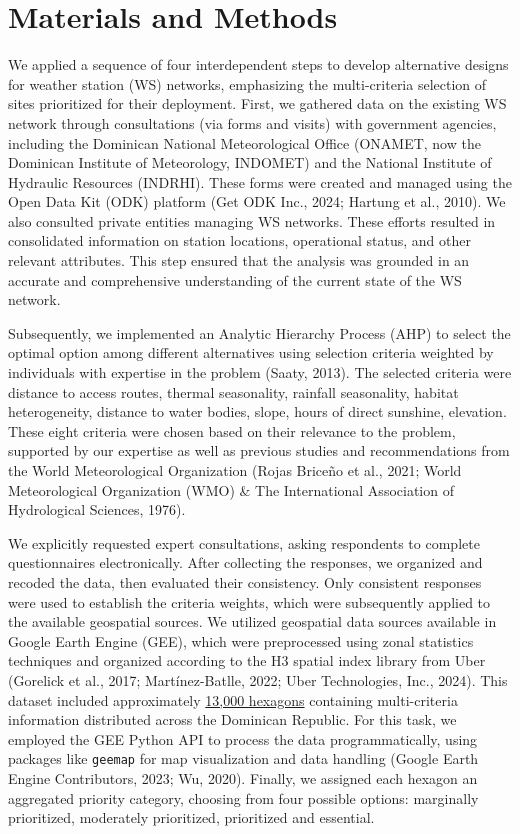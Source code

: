 \documentclass[spanish]{article}
\begin{document}
\hypertarget{materials-and-methods}{%
\section{Materials and Methods}\label{materials-and-methods}}

We applied a sequence of four interdependent steps to develop
alternative designs for weather station (WS) networks, emphasizing the
multi-criteria selection of sites prioritized for their deployment.
First, we gathered data on the existing WS network through consultations
(via forms and visits) with government agencies, including the Dominican
National Meteorological Office (ONAMET, now the Dominican Institute of
Meteorology, INDOMET) and the National Institute of Hydraulic Resources
(INDRHI). These forms were created and managed using the Open Data Kit
(ODK) platform (Get ODK Inc., 2024; Hartung et al., 2010). We also
consulted private entities managing WS networks. These efforts resulted
in consolidated information on station locations, operational status,
and other relevant attributes. This step ensured that the analysis was
grounded in an accurate and comprehensive understanding of the current
state of the WS network.

Subsequently, we implemented an Analytic Hierarchy Process (AHP) to
select the optimal option among different alternatives using selection
criteria weighted by individuals with expertise in the problem (Saaty,
2013). The selected criteria were distance to access routes, thermal
seasonality, rainfall seasonality, habitat heterogeneity, distance to
water bodies, slope, hours of direct sunshine, elevation. These eight
criteria were chosen based on their relevance to the problem, supported
by our expertise as well as previous studies and recommendations from
the World Meteorological Organization (Rojas Briceño et al., 2021; World
Meteorological Organization (WMO) \& The International Association of
Hydrological Sciences, 1976).

We explicitly requested expert consultations, asking respondents to
complete questionnaires electronically. After collecting the responses,
we organized and recoded the data, then evaluated their consistency.
Only consistent responses were used to establish the criteria weights,
which were subsequently applied to the available geospatial sources. We
utilized geospatial data sources available in Google Earth Engine (GEE),
which were preprocessed using zonal statistics techniques and organized
according to the H3 spatial index library from Uber (Gorelick et al.,
2017; Martínez-Batlle, 2022; Uber Technologies, Inc., 2024). This
dataset included approximately
\href{https://geofis.github.io/zonal-statistics/README.html}{13,000
hexagons} containing multi-criteria information distributed across the
Dominican Republic. For this task, we employed the GEE Python API to
process the data programmatically, using packages like \texttt{geemap}
for map visualization and data handling (Google Earth Engine
Contributors, 2023; Wu, 2020). Finally, we assigned each hexagon an
aggregated priority category, choosing from four possible options:
marginally prioritized, moderately prioritized, prioritized and
essential.
\end{document}

